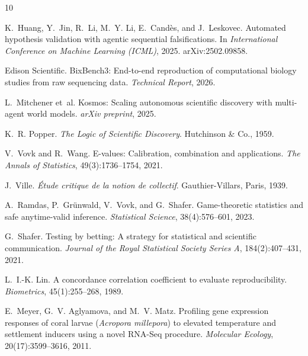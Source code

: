 \documentclass[10pt,twocolumn]{article}
\begin{document}
\begin{thebibliography}{10}

K.~Huang, Y.~Jin, R.~Li, M.~Y. Li, E.~Cand\`es, and J.~Leskovec.
\newblock Automated hypothesis validation with agentic sequential falsifications.
\newblock In \emph{International Conference on Machine Learning (ICML)}, 2025. arXiv:2502.09858.

Edison Scientific.
\newblock BixBench3: End-to-end reproduction of computational biology studies from raw sequencing data.
\newblock \emph{Technical Report}, 2026.

L.~Mitchener et~al.
\newblock Kosmos: Scaling autonomous scientific discovery with multi-agent world models.
\newblock \emph{arXiv preprint}, 2025.

K.~R. Popper.
\newblock \emph{The Logic of Scientific Discovery}.
\newblock Hutchinson \& Co., 1959.

V.~Vovk and R.~Wang.
\newblock E-values: Calibration, combination and applications.
\newblock \emph{The Annals of Statistics}, 49(3):1736--1754, 2021.

J.~Ville.
\newblock \emph{\'Etude critique de la notion de collectif}.
\newblock Gauthier-Villars, Paris, 1939.

A.~Ramdas, P.~Gr\"unwald, V.~Vovk, and G.~Shafer.
\newblock Game-theoretic statistics and safe anytime-valid inference.
\newblock \emph{Statistical Science}, 38(4):576--601, 2023.

G.~Shafer.
\newblock Testing by betting: A strategy for statistical and scientific communication.
\newblock \emph{Journal of the Royal Statistical Society Series A}, 184(2):407--431, 2021.

L.~I.-K. Lin.
\newblock A concordance correlation coefficient to evaluate reproducibility.
\newblock \emph{Biometrics}, 45(1):255--268, 1989.

E.~Meyer, G.~V. Aglyamova, and M.~V. Matz.
\newblock Profiling gene expression responses of coral larvae (\emph{Acropora millepora}) to elevated temperature and settlement inducers using a novel RNA-Seq procedure.
\newblock \emph{Molecular Ecology}, 20(17):3599--3616, 2011.


\end{thebibliography}
\end{document}
